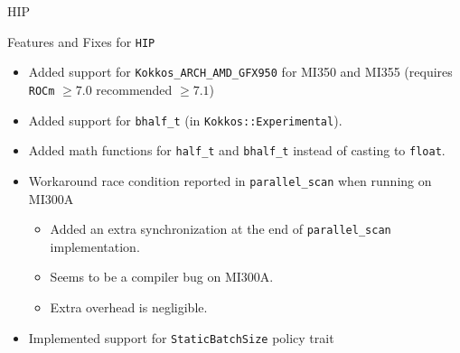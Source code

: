 
\begin{frame}[fragile]

  {\Huge HIP}

  \vspace{10pt}

\end{frame}


\begin{frame}[fragile]{Features and Fixes for \texttt{HIP}}

  \begin{itemize}
    \item Added support for \texttt{Kokkos\_ARCH\_AMD\_GFX950} for MI350 and MI355 (requires \texttt{ROCm} $\geq 7.0$ recommended $\geq 7.1$)
    \item Added support for \texttt{bhalf\_t} (in \texttt{Kokkos::Experimental}).
    \item Added math functions for \texttt{half\_t} and \texttt{bhalf\_t} instead of casting to \texttt{float}.
	\item Workaround race condition reported in \texttt{parallel\_scan} when running on MI300A
  	\begin{itemize}
		\item Added an extra synchronization at the end of \texttt{parallel\_scan} implementation.
		\item Seems to be a compiler bug on MI300A.
		\item Extra overhead is negligible.
  	\end{itemize}
    \item Implemented support for \texttt{StaticBatchSize} policy trait
  \end{itemize}

\end{frame}


